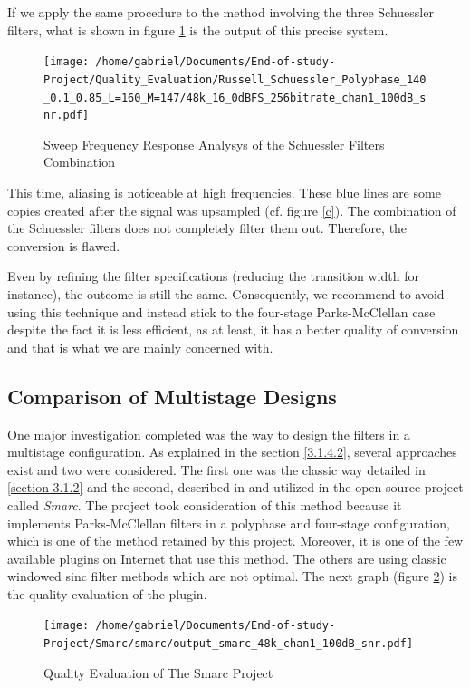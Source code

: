 If we apply the same procedure to the method involving the three Schuessler filters, what is shown in figure \ref{Figure 3.25} is the output of this precise system.

\begin{figure}[ht!]
	\centering
	\texttt{[image: /home/gabriel/Documents/End-of-study-Project/Quality\_Evaluation/Russell\_Schuessler\_Polyphase\_140\_0.1\_0.85\_L=160\_M=147/48k\_16\_0dBFS\_256bitrate\_chan1\_100dB\_snr.pdf]}
	\captionsetup{width=0.98\linewidth}
	\caption{Sweep Frequency Response Analysys of the Schuessler Filters Combination}\label{Figure 3.25}
\end{figure}

This time, aliasing is noticeable at high frequencies. These blue lines are some copies created after the signal was upsampled (cf. figure \ref{c}). The combination of the Schuessler filters does not completely filter them out. Therefore, the conversion is flawed. 

Even by refining the filter specifications (reducing the transition width for instance), the outcome is still the same. Consequently, we recommend to avoid using this technique and instead stick to the four-stage Parks-McClellan case despite the fact it is less efficient, as at least, it has a better quality of conversion and that is what we are mainly concerned with. 



\subsection{Comparison of Multistage Designs}\label{section 3.2.6}

One major investigation completed was the way to design the filters in a multistage configuration. As explained in the section \ref{3.1.4.2}, several approaches exist and two were considered. The first one was the classic way detailed in \ref{section 3.1.2} and the second, described in \cite{paristech} and utilized in the open-source project called \textit{Smarc}. The project took consideration of this method because it implements Parks-McClellan  filters in a polyphase and four-stage configuration, which is one of the method retained by this project. Moreover, it is one of the few available plugins on Internet that use this method. The others are using classic windowed sinc filter methods which are not optimal. The next graph (figure \ref{Figure 3.26}) is the quality evaluation of the plugin. 


\begin{figure}[ht!]
	\centering
	\texttt{[image: /home/gabriel/Documents/End-of-study-Project/Smarc/smarc/output\_smarc\_48k\_chan1\_100dB\_snr.pdf]}
	\caption{Quality Evaluation of The Smarc Project}\label{Figure 3.26}
\end{figure}


